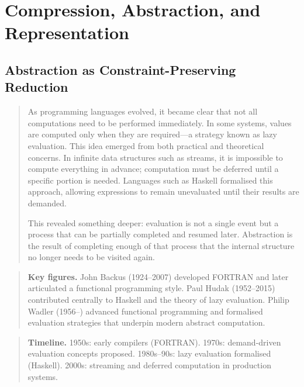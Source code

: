 \documentclass[11pt]{book}
\theoremstyle{plain}
\theoremstyle{definition}
\theoremstyle{remark}
\newenvironment{historicalpreamble}
  {\begin{quote}\small}
  {\end{quote}}
\newenvironment{historicalfigures}
  {\begin{quote}\small\textbf{Key figures.}\enspace\ignorespaces}
  {\end{quote}}
\newenvironment{paradigmtimeline}
  {\begin{quote}\small\textbf{Timeline.}\enspace\ignorespaces}
  {\end{quote}}
\begin{document}
\part{Compression, Abstraction, and Representation}

\chapter{Abstraction as Constraint-Preserving Reduction}

\begin{historicalpreamble}
As programming languages evolved, it became clear that not all
computations need to be performed immediately. In some systems, values are
computed only when they are required---a strategy known as lazy evaluation.
This idea emerged from both practical and theoretical concerns. In infinite
data structures such as streams, it is impossible to compute everything in
advance; computation must be deferred until a specific portion is needed.
Languages such as Haskell formalised this approach, allowing expressions to
remain unevaluated until their results are demanded.

This revealed something deeper: evaluation is not a single event but a
process that can be partially completed and resumed later. Abstraction
is the result of completing enough of that process that the internal
structure no longer needs to be visited again.
\end{historicalpreamble}

\begin{historicalfigures}
John Backus (1924--2007) developed FORTRAN and later articulated a
functional programming style. Paul Hudak (1952--2015) contributed
centrally to Haskell and the theory of lazy evaluation. Philip Wadler
(1956--) advanced functional programming and formalised evaluation
strategies that underpin modern abstract computation.
\end{historicalfigures}

\begin{paradigmtimeline}
1950s: early compilers (FORTRAN). \quad
1970s: demand-driven evaluation concepts proposed. \quad
1980s--90s: lazy evaluation formalised (Haskell). \quad
2000s: streaming and deferred computation in production systems.
\end{paradigmtimeline}
\end{document}
